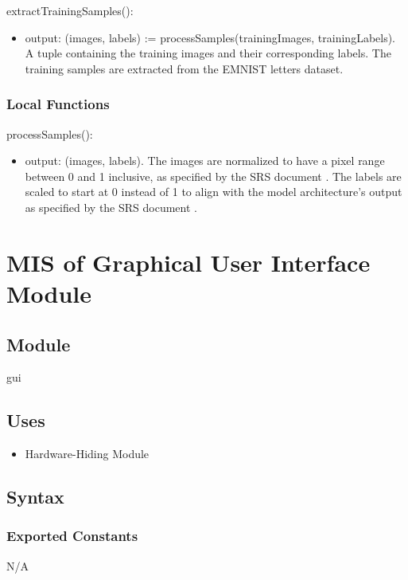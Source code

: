 \documentclass[12pt, titlepage]{article}
\begin{document}
\noindent extractTrainingSamples():
\begin{itemize}
\item output: (images, labels) := processSamples(trainingImages, trainingLabels).
A tuple containing the training images and their corresponding labels. The
training samples are extracted from the EMNIST letters dataset.
\end{itemize}

\subsubsection{Local Functions}

\noindent processSamples():
\begin{itemize}
\item output: (images, labels). The images are normalized to have a pixel range
between 0 and 1 inclusive, as specified by the SRS document \citep{SRS}. The
labels are scaled to start at 0 instead of 1 to align with the model
architecture's output as specified by the SRS document \citep{SRS}.
\end{itemize}


\newpage
\section{MIS of Graphical User Interface Module} \label{MGUI}

\subsection{Module}

gui
\subsection{Uses}

\begin{itemize}
  \item Hardware-Hiding Module
\end{itemize}

\subsection{Syntax}

\subsubsection{Exported Constants}

N/A
\end{document}
